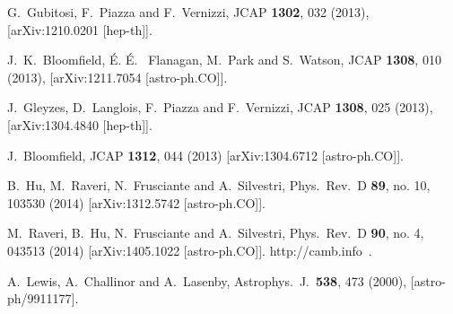 \documentclass[prd,nofootinbib,showpacs]{revtex4}
\begin{document}
{%





\begin{thebibliography}{999}


  G.~Gubitosi, F.~Piazza and F.~Vernizzi,
JCAP {\bf 1302}, 032 (2013),
   [arXiv:1210.0201 [hep-th]]. 
 
  J.~K.~Bloomfield, \'E. \'E. ~Flanagan, M.~Park and S.~Watson,
JCAP {\bf 1308}, 010  (2013),
  [arXiv:1211.7054 [astro-ph.CO]].  
	
  J.~Gleyzes, D.~Langlois, F.~Piazza and F.~Vernizzi,
  JCAP {\bf 1308}, 025 (2013),
   [arXiv:1304.4840 [hep-th]].

  J.~Bloomfield,
  JCAP {\bf 1312}, 044 (2013)
  [arXiv:1304.6712 [astro-ph.CO]].
  
  B.~Hu, M.~Raveri, N.~Frusciante and A.~Silvestri,
  Phys.\ Rev.\ D {\bf 89}, no. 10, 103530 (2014)
  [arXiv:1312.5742 [astro-ph.CO]].

  M.~Raveri, B.~Hu, N.~Frusciante and A.~Silvestri,
  Phys.\ Rev.\ D {\bf 90}, no. 4, 043513 (2014)
  [arXiv:1405.1022 [astro-ph.CO]].
http://camb.info \,.

  A.~Lewis, A.~Challinor and A.~Lasenby,
  Astrophys.\ J.\  {\bf 538}, 473 (2000),
  [astro-ph/9911177].
	

\end{thebibliography}}
\end{document}
